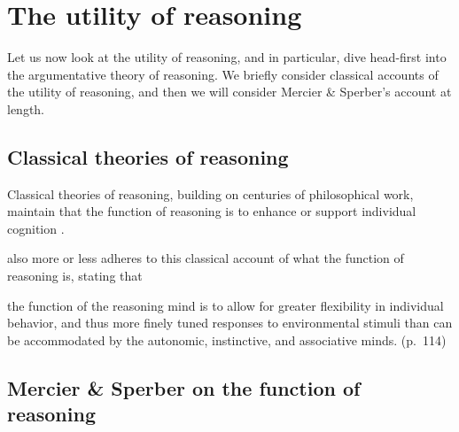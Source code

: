 \section{The utility of reasoning}

Let us now look at the utility of reasoning, and in particular, dive head-first into the argumentative theory of reasoning.
We briefly consider classical accounts of the utility of reasoning, and then we will consider Mercier \& Sperber's account at length.

\subsection{Classical theories of reasoning}


Classical theories of reasoning, building on centuries of philosophical work, maintain that the function of reasoning is to enhance or support individual cognition \citep{MS11}.



\citet{Goel22} also more or less adheres to this classical account of what the function of reasoning is, stating that
\begin{quoting}
    the function of the reasoning mind is to allow for greater flexibility in individual behavior, and thus more finely tuned responses to environmental stimuli than can be accommodated by the autonomic, instinctive, and associative minds.
    \hfill (p.~114)
\end{quoting}

\subsection{Mercier \& Sperber on the function of reasoning}
\label{sec:exp-atr}


